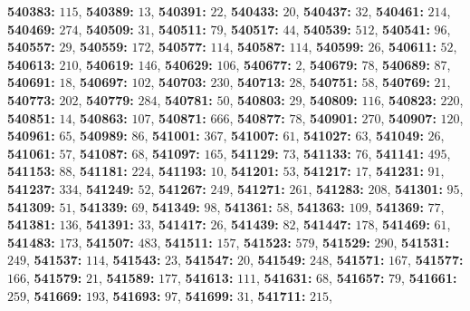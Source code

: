 \textsf{\bfseries 540383:} $115$, \textsf{\bfseries 540389:} $13$, \textsf{\bfseries 540391:} $22$, \textsf{\bfseries 540433:} $20$, \textsf{\bfseries 540437:} $32$, \textsf{\bfseries 540461:} $214$, \textsf{\bfseries 540469:} $274$, \textsf{\bfseries 540509:} $31$, \textsf{\bfseries 540511:} $79$, \textsf{\bfseries 540517:} $44$, \textsf{\bfseries 540539:} $512$, \textsf{\bfseries 540541:} $96$, \textsf{\bfseries 540557:} $29$, \textsf{\bfseries 540559:} $172$, \textsf{\bfseries 540577:} $114$, \textsf{\bfseries 540587:} $114$, \textsf{\bfseries 540599:} $26$, \textsf{\bfseries 540611:} $52$, \textsf{\bfseries 540613:} $210$, \textsf{\bfseries 540619:} $146$, \textsf{\bfseries 540629:} $106$, \textsf{\bfseries 540677:} $2$, \textsf{\bfseries 540679:} $78$, \textsf{\bfseries 540689:} $87$, \textsf{\bfseries 540691:} $18$, \textsf{\bfseries 540697:} $102$, \textsf{\bfseries 540703:} $230$, \textsf{\bfseries 540713:} $28$, \textsf{\bfseries 540751:} $58$, \textsf{\bfseries 540769:} $21$, \textsf{\bfseries 540773:} $202$, \textsf{\bfseries 540779:} $284$, \textsf{\bfseries 540781:} $50$, \textsf{\bfseries 540803:} $29$, \textsf{\bfseries 540809:} $116$, \textsf{\bfseries 540823:} $220$, \textsf{\bfseries 540851:} $14$, \textsf{\bfseries 540863:} $107$, \textsf{\bfseries 540871:} $666$, \textsf{\bfseries 540877:} $78$, \textsf{\bfseries 540901:} $270$, \textsf{\bfseries 540907:} $120$, \textsf{\bfseries 540961:} $65$, \textsf{\bfseries 540989:} $86$, \textsf{\bfseries 541001:} $367$, \textsf{\bfseries 541007:} $61$, \textsf{\bfseries 541027:} $63$, \textsf{\bfseries 541049:} $26$, \textsf{\bfseries 541061:} $57$, \textsf{\bfseries 541087:} $68$, \textsf{\bfseries 541097:} $165$, \textsf{\bfseries 541129:} $73$, \textsf{\bfseries 541133:} $76$, \textsf{\bfseries 541141:} $495$, \textsf{\bfseries 541153:} $88$, \textsf{\bfseries 541181:} $224$, \textsf{\bfseries 541193:} $10$, \textsf{\bfseries 541201:} $53$, \textsf{\bfseries 541217:} $17$, \textsf{\bfseries 541231:} $91$, \textsf{\bfseries 541237:} $334$, \textsf{\bfseries 541249:} $52$, \textsf{\bfseries 541267:} $249$, \textsf{\bfseries 541271:} $261$, \textsf{\bfseries 541283:} $208$, \textsf{\bfseries 541301:} $95$, \textsf{\bfseries 541309:} $51$, \textsf{\bfseries 541339:} $69$, \textsf{\bfseries 541349:} $98$, \textsf{\bfseries 541361:} $58$, \textsf{\bfseries 541363:} $109$, \textsf{\bfseries 541369:} $77$, \textsf{\bfseries 541381:} $136$, \textsf{\bfseries 541391:} $33$, \textsf{\bfseries 541417:} $26$, \textsf{\bfseries 541439:} $82$, \textsf{\bfseries 541447:} $178$, \textsf{\bfseries 541469:} $61$, \textsf{\bfseries 541483:} $173$, \textsf{\bfseries 541507:} $483$, \textsf{\bfseries 541511:} $157$, \textsf{\bfseries 541523:} $579$, \textsf{\bfseries 541529:} $290$, \textsf{\bfseries 541531:} $249$, \textsf{\bfseries 541537:} $114$, \textsf{\bfseries 541543:} $23$, \textsf{\bfseries 541547:} $20$, \textsf{\bfseries 541549:} $248$, \textsf{\bfseries 541571:} $167$, \textsf{\bfseries 541577:} $166$, \textsf{\bfseries 541579:} $21$, \textsf{\bfseries 541589:} $177$, \textsf{\bfseries 541613:} $111$, \textsf{\bfseries 541631:} $68$, \textsf{\bfseries 541657:} $79$, \textsf{\bfseries 541661:} $259$, \textsf{\bfseries 541669:} $193$, \textsf{\bfseries 541693:} $97$, \textsf{\bfseries 541699:} $31$, \textsf{\bfseries 541711:} $215$, 
